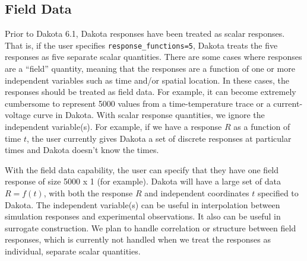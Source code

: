 \subsection{Field Data}
Prior to Dakota 6.1, Dakota responses have been treated as scalar
responses.  That is, if the user specifies \texttt{response\_functions=5},
Dakota treats the five responses as five separate scalar quantities.
There are some cases where responses are a ``field'' quantity, meaning
that the responses are a function of one or more independent variables
such as time and/or spatial location.  In these cases, the responses
should be treated as field data.  For example, it can become extremely
cumbersome to represent 5000 values from a time-temperature trace or a
current-voltage curve in Dakota.  With scalar response quantities, we
ignore the independent variable(s).  For example, if we have a response
$R$ as a function of time $t$, the user currently gives Dakota a set of
discrete responses at particular times and Dakota doesn't know the times.

With the field data capability, the user can specify that they have
one field response of size 5000 x 1 (for example).  Dakota will have a
large set of data $R=f(t)$, with both the response $R$ and independent
coordinates $t$ specified to Dakota.  The independent variable(s) can be
useful in interpolation between simulation responses and experimental
observations.  It also can be useful in surrogate construction.
We plan to handle correlation or structure between field responses,
which is currently not handled when we treat the responses as individual,
separate scalar quantities.

